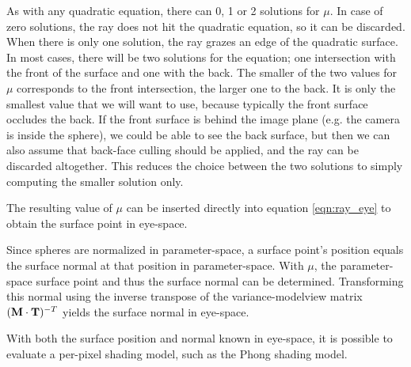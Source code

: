 As with any quadratic equation, there can 0, 1 or 2 solutions for $\mu$. 
In case of zero solutions, the ray does not hit the quadratic equation, so it can be discarded. 
When there is only one solution, the ray grazes an edge of the quadratic surface.
In most cases, there will be two solutions for the equation; one intersection with the front of the surface and one with the back. 
The smaller of the two values for $\mu$ corresponds to the front intersection, the larger one to the back. 
It is only the smallest value that we will want to use, because typically the front surface occludes the back. 
If the front surface is behind the image plane (e.g. the camera is inside the sphere), we could be able to see the back surface, but then
we can also assume that back-face culling should be applied, and the ray can be discarded altogether.
This reduces the choice between the two solutions to simply computing the smaller solution only.

The resulting value of $\mu$ can be inserted directly into equation \ref{eqn:ray_eye} to obtain the surface point in eye-space.

Since spheres are normalized in parameter-space, a surface point's position equals the surface normal at that position in parameter-space.
With $\mu$, the parameter-space surface point and thus the surface normal can be determined. Transforming this normal using the inverse transpose
of the variance-modelview matrix $({\bf M \cdot T})^{-T}$ yields the surface normal in eye-space.

With both the surface position and normal known in eye-space, it is possible to evaluate a per-pixel shading model, such as the Phong shading model.
